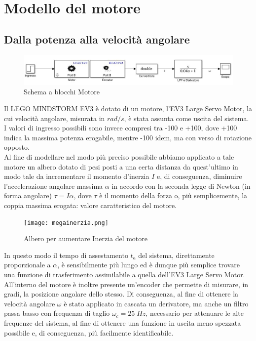 \chapter{Modello del motore}
\section{Dalla potenza alla velocità angolare}

\begin{figure}[ht]
	\centering
	\includegraphics[width=\textwidth]{motoreSimulink.jpg}
	\caption{Schema a blocchi Motore}
	\label{motoreSimulink}
\end{figure}
Il LEGO MINDSTORM EV3 è dotato di un motore, l'EV3 Large Servo Motor, la cui velocità angolare, misurata in $rad/s$, è stata assunta come uscita del sistema.\\
I valori di ingresso possibili sono invece compresi tra -100 e +100, dove +100 indica la massima potenza erogabile, mentre -100 idem, ma con verso di rotazione opposto.\\
Al fine di modellare nel modo più preciso possibile abbiamo applicato a tale motore un albero dotato di pesi posti a una certa distanza da quest'ultimo in modo tale da incrementare il momento d'inerzia $I$ e, di conseguenza, diminuire l'accelerazione angolare massima $\alpha$ in accordo con la seconda legge di Newton (in forma angolare) $\tau = I\alpha$, dove $\tau$ è il momento della forza o, più semplicemente, la coppia massima erogata: valore caratteristico del motore.
\newpage
\begin{figure}[ht]
	\centering
	\texttt{[image: megainerzia.png]}
	\caption{Albero per aumentare Inerzia del motore}
	\label{megainerzia}
\end{figure}
In questo modo il tempo di assestamento $t_a$ del sistema, direttamente proporzionale a $\alpha$, è sensibilmente più lungo ed è dunque più semplice trovare una funzione di trasferimento assimilabile a quella dell'EV3 Large Servo Motor.\\
All'interno del motore è inoltre presente un'encoder che permette di misurare, in gradi, la posizione angolare dello stesso.
Di conseguenza, al fine di ottenere la velocità angolare $\omega$ è stato applicato in cascata un derivatore, ma anche un filtro passa basso con frequenza di taglio $\omega_c=25\;Hz$, necessario per attenuare le alte frequenze del sistema, al fine di ottenere una funzione in uscita meno spezzata possibile e, di conseguenza, più facilmente identificabile.\\
